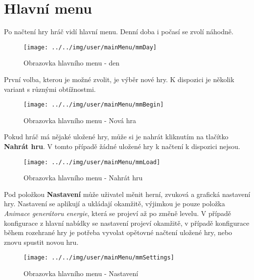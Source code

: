 
\section{Hlavní menu}

Po načtení hry hráč vidí hlavní menu. Denní doba i počasí se zvolí náhodně.

\begin{figure}[!ht]\centering
\texttt{[image: ../../img/user/mainMenu/mmDay]}

\caption{Obrazovka hlavního menu - den}
\label{fig:user_mainMenu_mmDay}

\end{figure}


\FloatBarrier

První volba, kterou je možné zvolit, je výběr nové hry. K dispozici je několik variant s různými obtížnostmi.

\begin{figure}[!ht]\centering
\texttt{[image: ../../img/user/mainMenu/mmBegin]}

\caption{Obrazovka hlavního menu - Nová hra}
\label{fig:user_mainMenu_mmBegin}

\end{figure}
\FloatBarrier

Pokud hráč má nějaké uložené hry, může si je nahrát kliknutím na tlačítko \textbf{Nahrát hru}. V tomto případě žádné uložené hry k načtení k dispozici nejsou.

\begin{figure}[!ht]\centering
\texttt{[image: ../../img/user/mainMenu/mmLoad]}

\caption{Obrazovka hlavního menu - Nahrát hru}
\label{fig:user_mainMenu_mmLoad}

\end{figure}
\FloatBarrier

Pod položkou \textbf{Nastavení} může uživatel měnit herní, zvuková a grafická nastavení hry. Nastavení se aplikují a ukládají okamžitě, výjimkou je pouze položka \textit{Animace generátoru energie}, která se projeví až po změně levelu. V případě konfigurace z hlavní nabídky se nastavení projeví okamžitě, v případě konfigurace během rozehrané hry je potřeba vyvolat opětovné načtení uložené hry, nebo znovu spustit novou hru.

\begin{figure}[!ht]\centering
\texttt{[image: ../../img/user/mainMenu/mmSettings]}

\caption{Obrazovka hlavního menu - Nastavení}
\label{fig:user_mainMenu_mmSettings}

\end{figure}

\FloatBarrier